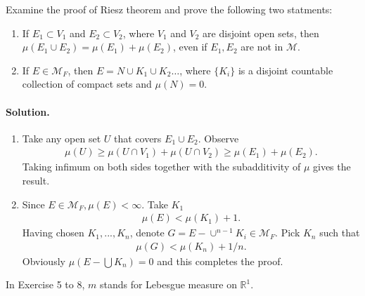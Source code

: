 \documentclass[../main.tex]{subfiles}
\begin{document}
 \begin{exercise}
   Examine the proof of Riesz theorem and prove the following two statments:
   \begin{enumerate}
     \item If $ E_1 \subset V_1 $ and $ E_2 \subset V_2 $, where $ V_1 $ and $ V_2 $ are disjoint open sets, then $ \mu(E_1 \cup E_2) = \mu(E_1) + \mu(E_2) $, even if $ E_1, E_2 $ are not in $ \mathcal{M} $.
     \item If $ E \in \mathcal{M}_F $, then $ E = N \cup K_1 \cup K_2 \dots $, where $ \{K_i\} $ is a disjoint countable collection of compact sets and $ \mu(N) = 0 $.
   \end{enumerate}

   \paragraph{Solution. }
   \begin{enumerate}
     \item Take any open set $ U $ that covers $ E_1 \cup E_2 $. Observe
     \begin{align*}
       \mu(U) \ge \mu(U \cap V_1) + \mu(U \cap V_2) \ge \mu(E_1) + \mu(E_2).
     \end{align*}
     Taking infimum on both sides together with the subadditivity of $ \mu $ gives the result.

     \item Since $ E \in \mathcal{M}_F, \mu(E) < \infty $. Take $ K_1 $
     \begin{align*}
       \mu(E) < \mu(K_1) + 1.
     \end{align*}
     Having chosen $ K_1, ..., K_n $, denote $ G = E - \cup ^{n-1} K_i \in \mathcal{M}_F$. Pick $ K_n $ such that
     \begin{align*}
        \mu(G) < \mu(K_n) + 1/n .
     \end{align*}
     Obviously $ \mu(E - \bigcup K_n) = 0 $ and this completes the proof.


   \end{enumerate}
 \end{exercise}

 In Exercise 5 to 8, $ m $ stands for Lebesgue measure on $ \mathbb{R}^1 $.
\end{document}
